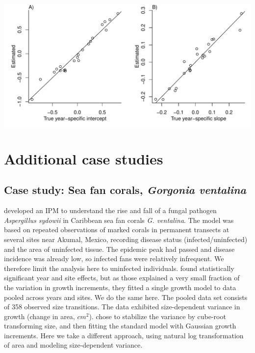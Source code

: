 \documentclass[12pt]{article}
\begin{document}
\bigskip 

\centerline{\includegraphics[width=\textwidth]{figures/SimpleShrinkage.pdf}}

\section{Additional case studies}
\subsection{Case study: Sea fan corals, \emph{Gorgonia ventalina}}

\cite{bruno-etal-2011} developed an IPM to understand the rise and fall of a fungal pathogen \emph{Aspergillus sydowii} in Caribbean sea fan corals \emph{G. ventalina}. 
The model was based on repeated observations of marked corals in permanent transects at several sites near Akumal, Mexico, recording disease status (infected/uninfected) and the area of uninfected tissue. 
The epidemic peak had passed and disease incidence was already low, so infected fans were relatively infrequent. 
We therefore limit the analysis here to uninfected individuals.
\citet{bruno-etal-2011} found statistically significant year and site effects, but as those explained a very small fraction of the variation in growth increments, they fitted a single growth model to data pooled across years and sites. 
We do the same here. 
The pooled data set consists of 358 observed size transitions. 
The data exhibited size-dependent variance in growth (change in area, $cm^2$).  
\cite{bruno-etal-2011} chose to stabilize the variance by cube-root transforming size, and then fitting the standard model with Gaussian growth increments. 
Here we take a different approach, using natural log transformation of area and modeling size-dependent variance. 
\end{document}
